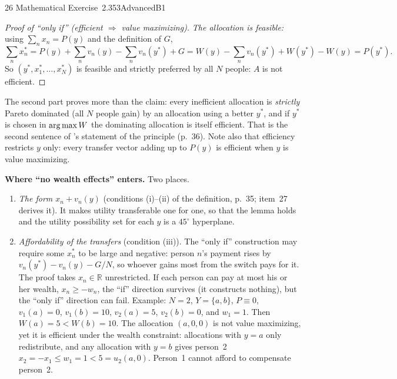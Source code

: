 \begin{exsol}{26}{\MR{} Mathematical Exercise~2.3}{53}{Advanced}{B1}
\begin{proof}[Proof of ``only if'' (efficient $\Rightarrow$ value maximizing)]
\emph{The allocation is feasible:} using $\sum_n x_n = P(y)$ and the definition of $G$,
\[
  \sum_n x^*_n = P(y) + \sum_n v_n(y) - \sum_n v_n(y^*) + G
  = W(y) - \sum_n v_n(y^*) + W(y^*) - W(y) = P(y^*) .
\]
So $(y^*, x^*_1, \dots, x^*_N)$ is feasible and strictly preferred by all $N$ people: $A$ is not
efficient.
\end{proof}

The second part proves more than the claim: every inefficient allocation is \emph{strictly}
Pareto dominated (all $N$ people gain) by an allocation using a better $y^*$, and if $y^*$ is
chosen in $\operatorname*{arg\,max} W$ the dominating allocation is itself efficient. That is the second sentence of
\MR's statement of the principle (p.~36). Note also that efficiency restricts $y$ only: every
transfer vector adding up to $P(y)$ is efficient when $y$ is value maximizing.

\textbf{Where ``no wealth effects'' enters.} Two places.
\begin{enumerate}[label=(\roman*)]
  \item \emph{The form $x_n + v_n(y)$} (conditions (i)--(ii) of the definition, \MR{} p.~35;
  item~27 derives it). It makes utility transferable one for one, so that the lemma holds and the
  utility possibility set for each $y$ is a $45^\circ$ hyperplane.
  \item \emph{Affordability of the transfers} (condition (iii)). The ``only if'' construction
  may require some $x^*_n$ to be large and negative: person $n$'s payment rises by
  $v_n(y^*) - v_n(y) - G/N$, so whoever gains most from the switch pays for it. The proof takes $x_n \in \mathbb{R}$ unrestricted. If each person can pay at most
  his or her wealth, $x_n \ge -w_n$, the ``if'' direction survives (it constructs nothing), but
  the ``only if'' direction can fail. Example: $N = 2$, $Y = \{a, b\}$, $P \equiv 0$,
  $v_1(a) = 0$, $v_1(b) = 10$, $v_2(a) = 5$, $v_2(b) = 0$, and $w_1 = 1$. Then $W(a) = 5 < W(b) = 10$.
  The allocation $(a, 0, 0)$ is not value maximizing, yet it is efficient under the wealth
  constraint: allocations with $y = a$ only redistribute, and any allocation with $y = b$
  gives person~2 $x_2 = -x_1 \le w_1 = 1 < 5 = u_2(a, 0)$. Person~1 cannot afford to compensate
  person~2.
\end{enumerate}


\end{exsol}
